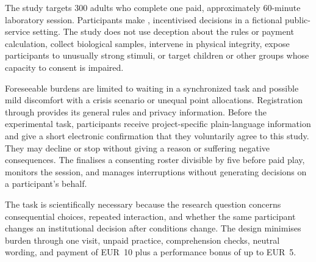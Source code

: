 


\small

The study targets 300 adults who complete one paid, approximately 60-minute laboratory session. Participants make , incentivised decisions in a fictional public-service setting. The study does not use deception about the rules or payment calculation, collect biological samples, intervene in physical integrity, expose participants to unusually strong stimuli, or target children or other groups whose capacity to consent is impaired.

Foreseeable burdens are limited to waiting in a synchronized task and possible mild discomfort with a crisis scenario or unequal point allocations. Registration through  provides its general rules and privacy information. Before the experimental task, participants receive project-specific plain-language information and give a short electronic confirmation that they voluntarily agree to this study.  They may decline or stop without giving a reason or suffering negative consequences. The  finalises a consenting roster divisible by five before paid play, monitors the session, and manages interruptions without generating decisions on a participant's behalf. 

The task is scientifically necessary because the research question concerns consequential choices, repeated interaction, and whether the same participant changes an institutional decision after conditions change. The design minimises burden through one visit, unpaid practice, comprehension checks, neutral wording, and payment of EUR~10 plus a performance bonus of up to EUR~5. 

